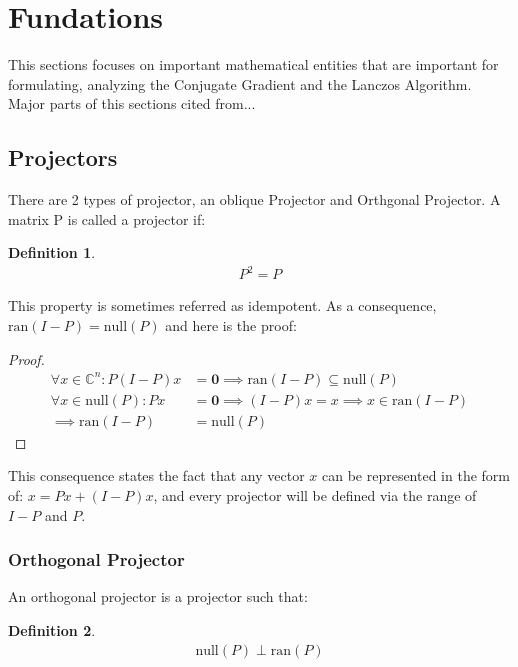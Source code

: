 \documentclass[]{article}
\theoremstyle{definition}
\newtheorem{definition}{Definition}
\begin{document}
\section{Fundations}
    This sections focuses on important mathematical entities that are important for formulating, analyzing the Conjugate Gradient and the Lanczos Algorithm. Major parts of this sections cited from... 

    \subsection{Projectors}
        There are 2 types of projector, an oblique Projector and Orthgonal Projector. A matrix P is called a projector if: 
        \begin{definition}
            \begin{align}
                P^2 = P
            \end{align}    
        \end{definition}
        
        This property is sometimes referred as idempotent. As a consequence, $\text{ran}(I - P) = \text{null}(P)$ and here is the proof: 
        \begin{proof}
            \begin{align}
                \forall x \in \mathbb{C}^n: P(I - P)x &= \mathbf{0} \implies \text{ran}(I - P)\subseteq \text{null}(P)
                \\
                \forall x \in \text{null}(P): Px &= \mathbf{0} \implies (I - P)x = x \implies x \in \text{ran}(I - P)
                \\
                \implies \text{ran}(I - P) &= \text{null}(P)
                \label{a:1.1.4}
            \end{align}
        \end{proof}
        \noindent
        This consequence states the fact that any vector $x$ can be represented in the form of: $x = Px + (I - P)x$, and every projector will be defined via the range of $I - P$ and $P$. 
        
        \subsubsection{Orthogonal Projector}
            An orthogonal projector is a projector such that: 
            \begin{definition}
                \begin{align}
                    \text{null}(P) \perp \text{ran}(P)
                \end{align}    
            \end{definition}
            
\end{document}
